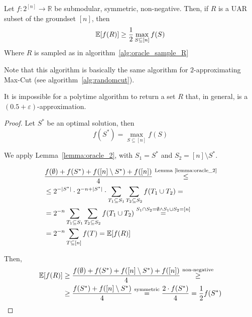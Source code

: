     \begin{theorem}\label{thm:oracle_r_uar}
        Let $f : 2^{[n]} \rightarrow \mathbb{R}$ be submodular, symmetric, non-negative.
        Then, if $R$ is a UAR subset of the groundset $[n]$, then
        \[ \mathbb{E}[f(R)] \geq \frac{1}{2} \max_{S \subseteq [n]} f(S) \]
        Where $R$ is sampled as in algorithm~\ref{alg:oracle_sample_R}
    \end{theorem}

    
    Note that this algorithm is basically the same algorithm for $2$-approximating Max-Cut (see algorithm~\ref{alg:randomcut}).

    It is impossible for a polytime algorithm to return a set $R$ that, in general, is a $(0.5 + \varepsilon)$-approximation.

    \begin{proof}
        Let $S^*$ be an optimal solution, then
        \[ f(S^*) = \max_{S \subseteq [n]} f(S) \]

        We apply Lemma~\ref{lemma:oracle_2}, with $S_1 = S^*$ and $S_2 = [n] \setminus S^*$.

        \begin{equation*}
            \begin{split}
                &\frac{f(\emptyset) + f(S^*) + f([n] \setminus S^*) + f([n])}{4} \overset{\text{Lemma~\ref{lemma:oracle_2}}}{\leq}\\
                &\leq 2^{- \vert S^* \vert} \cdot 2^{-n + \vert S^* \vert} \cdot \sum_{T_1 \subseteq S_1} \sum_{T_2 \subseteq S_2} f(T_1 \cup T_2) =\\
                &= 2^{-n} \sum_{T_1 \subseteq S_1} \sum_{T_2 \subseteq S_2} f(T_1 \cup T_2) \overset{S_1 \cap S_2 = \emptyset \wedge S_1 \cup S_2 = [n]}{=}\\
                &= 2^{-n} \sum_{T \subseteq [n]} f(T) = \mathbb{E}[f(R)]
            \end{split}
        \end{equation*}

        Then,
        \begin{equation*}
            \begin{split}
                \mathbb{E}[f(R)] &\geq \frac{f(\emptyset) + f(S^*) + f([n] \setminus S^*) + f([n])}{4} \overset{\text{non-negative}}{\geq}\\
                    &\geq \frac{f(S^*) + f([n] \setminus S^*)}{4} \overset{\text{symmetric}}{=} \frac{2 \cdot f(S^*)}{4} = \frac{1}{2} f(S^*)
            \end{split}
        \end{equation*}
    \end{proof}

